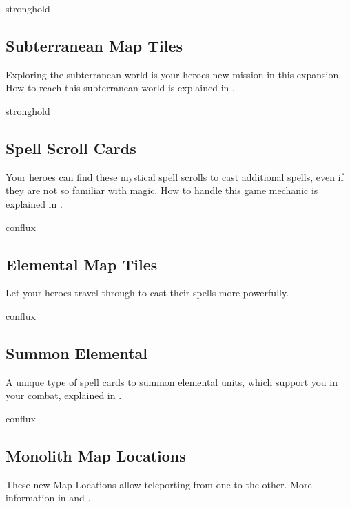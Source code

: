 \begin{multicols*}{2}
\vspace*{1em}
\begin{expansion}{stronghold}
	\subsection*{Subterranean Map Tiles}
	Exploring the subterranean world is your heroes new mission in this expansion. How to reach this subterranean world is explained in .
\end{expansion}

\vspace*{1em}
\begin{expansion}{stronghold}
	\subsection*{Spell Scroll Cards}
	Your heroes can find these mystical spell scrolls to cast additional spells, even if they are not so familiar with magic. How to handle this game mechanic is explained in .
\end{expansion}

\vspace*{1em}
\begin{expansion}{conflux}
	\subsection*{Elemental Map Tiles}
	Let your heroes travel through  to cast their spells more powerfully.
\end{expansion}

\vspace*{1em}
\begin{expansion}{conflux}
	\subsection*{Summon Elemental}
	A unique type of spell cards to summon elemental units, which support you in your combat, explained in .
\end{expansion}

\vspace*{1em}
\begin{expansion}{conflux}
	\subsection*{Monolith Map Locations}
	These new Map Locations allow teleporting from one to the other. 
	More information in  and .
\end{expansion}


\end{multicols*}
